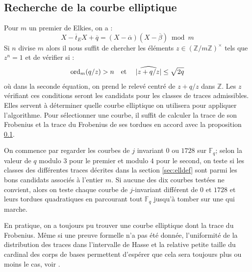 \documentclass[a4paper]{article} %
\numberwithin{section}{part}
\numberwithin{equation}{section}
\newcommand\zmodninv[1]{(\mathbb{Z}/#1\mathbb{Z})^{\times}}
\newcommand\GF[1]{\mathbb{F}_{#1}}
\newcommand\ZZ{\mathbb{Z}}
\newcommand\etmath{\textup{\quad et \quad}}
\newcommand\ord[2]{\textup{ord}_{#1}(#2)}
\begin{document}
\subsection{Recherche de la courbe elliptique}
Pour $m$ un premier de Elkies, on a :
\begin{equation}
X - \overline{t}_EX + \overline{q} = (X - \overline{\alpha})(X -
\overline{\beta})\bmod m
\end{equation}
Si $n$ divise $m$ alors il nous suffit de chercher les éléments
$z\in\zmodninv{m}$ tels que $z^n = 1$ et de vérifier si :
\begin{equation}
\ord{m}{q/z} > n \etmath \vert{\widehat{z + q/z}}\vert\leq\sqrt{2q}
\end{equation}
où dans la seconde équation, on prend le relevé centré de $z + q/z$ dans $\ZZ$. 
Les $z$ vérifiant ces conditions seront les candidats pour les classes de traces
admissibles. Elles servent à déterminer quelle courbe elliptique on utilisera
pour appliquer l'algorithme. Pour sélectionner une courbe, il suffit de calculer
la trace de son Frobenius et la trace du Frobenius de ses tordues en accord avec
la proposition \ref{}.\par
On commence par regarder les courbes de $j$ invariant $0$ ou $1728$ sur 
$\GF{q}$; selon la valeur de $q$ modulo $3$ pour le premier et modulo $4$ pour 
le second, on teste si les classes des différentes traces décrites dans la 
section \ref{sec:elldef} sont parmi les bons candidats associés à l'entier $m$. 
Si aucune des dix courbes testées ne convient, alors on teste chaque courbe de 
$j$-invariant différent de $0$ et $1728$ et leurs tordues quadratiques en 
parcourant tout $\GF{q}$ jusqu'à tomber sur une qui marche.\par
\begin{rem}
En pratique, on a toujours pu trouver une courbe elliptique dont la trace du
Frobenius. Même si une preuve formelle n'a pas été donnée, l'uniformité de la 
distribution des traces dans l'intervalle de Hasse et la relative petite taille
du cardinal des corps de bases permettent d'espérer que cela sera toujours plus
ou moins le cas, voir \cite{CasHen}.
\end{rem}
\end{document}
